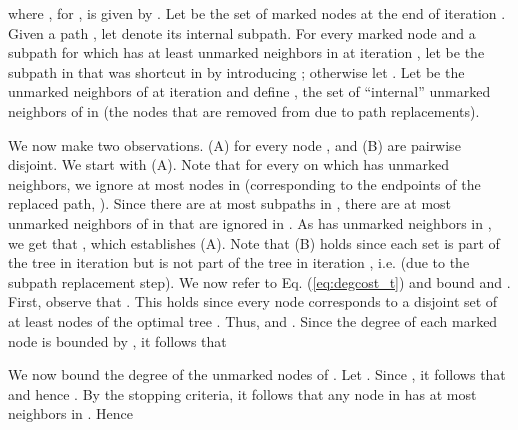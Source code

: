 \documentclass[12pt]{article}
\begin{document}
where , for , is given by . Let  be the set of marked nodes at the end of iteration . Given a path , let  denote its internal subpath. For every marked node  and a subpath  for which  has at least  unmarked neighbors in  at iteration , let  be the subpath in  that was shortcut in  by introducing ; otherwise let .
Let  be the unmarked neighbors of  at iteration  and define
, the set of ``internal'' unmarked neighbors of  in  (the nodes that are removed from  due to path replacements).

We now make two observations. (A)  for every node , and (B)  are pairwise disjoint. We start with (A). Note that for every  on which  has unmarked neighbors, we ignore at most  nodes in  (corresponding to the endpoints of the replaced path, ). Since there are at most  subpaths in , there are at most  unmarked neighbors of  in  that are ignored in . As  has  unmarked neighbors in , we get that
, which establishes (A). Note that (B) holds since each set  is part of the tree in iteration  but is not part of the tree in iteration , i.e.  (due to the subpath replacement step).
We now refer to Eq. (\ref{eq:degcost_t}) and bound  and . First, observe that . This holds since
every node  corresponds to a disjoint set  of at least  nodes of the optimal tree . Thus,  and . Since the degree of each marked node is bounded by , it follows that

We now bound the degree of the unmarked nodes  of . Let .
Since , it follows that  and hence .
By the stopping criteria, it follows that any node in  has at most  neighbors in .
Hence
\end{document}
